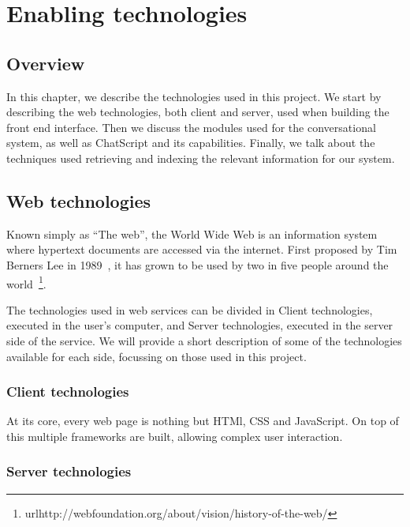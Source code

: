 \chapter{Enabling technologies}
\label{chap:enabling}

\section{Overview}

In this chapter, we describe the technologies used in this project. We start by describing the web technologies, both client and server, used when building the front end interface. Then we discuss the modules used for the conversational system, as well as ChatScript and its capabilities. Finally, we talk about the techniques used retrieving and indexing the relevant information for our system.

\section{Web technologies}



Known simply as ``The web'', the World Wide Web is an information system where hypertext documents are accessed via the internet. First proposed by Tim Berners Lee in 1989~\cite{berners1989information}, it has grown to be used by two in five people around the world~\footnote{url{http://webfoundation.org/about/vision/history-of-the-web/}}.

The technologies used in web services can be divided in Client technologies, executed in the user's computer, and Server technologies, executed in the server side of the service. We will provide a short description of some of the technologies available for each side, focussing on those used in this project.
\subsection{Client technologies}

At its core, every web page is nothing but HTMl, CSS and JavaScript. On top of this multiple frameworks are built, allowing complex user interaction. 


\subsection{Server technologies}

